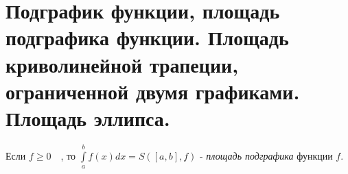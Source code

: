 \documentclass[../main.tex]{subfiles}
\begin{document}
\newpage
\hypertarget{q14}{\section{Подграфик функции, площадь подграфика функции. Площадь криволинейной трапеции, ограниченной двумя графиками. Площадь эллипса.}}
Если \( f \geq 0\quad\), то \( \displaystyle\int\limits_{ a}^{ b}f(x)dx=S\left( \left[ a,b\right],f\right)\) - \emph{площадь подграфика} функции \( f\).
\end{document}
